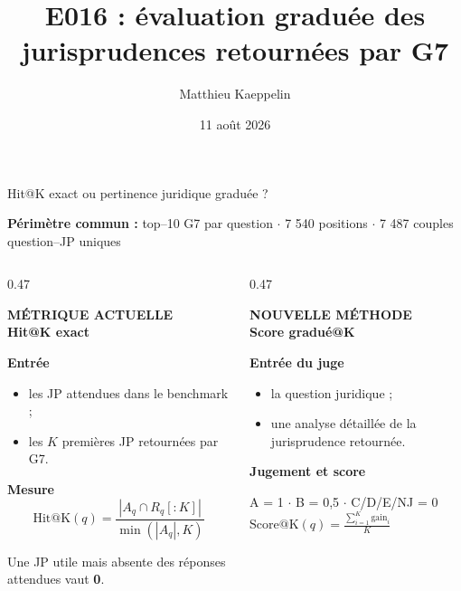 \documentclass[aspectratio=169,10pt]{beamer}
\title[E016 -- JP graduées]{E016 : évaluation graduée des jurisprudences retournées par G7}
\author{Matthieu Kaeppelin}
\institute{Stage FE Recherche}
\date{11 août 2026}
\newcommand{\keybox}[1]{%
  \begin{center}\colorbox{accentsoft}{\parbox{0.92\linewidth}{\centering #1}}\end{center}}
\begin{document}
\begin{frame}[t]{Hit@K exact ou pertinence juridique graduée ?}
  \scriptsize
  \keybox{\small\textbf{Périmètre commun :} top--10 G7 par question $\cdot$ 7 540 positions $\cdot$ 7 487 couples question--JP uniques}

  \vspace{0em}
  \begin{columns}[T,onlytextwidth]
    \begin{column}{0.47\textwidth}
      \begin{center}
        {\color{accent}\textbf{MÉTRIQUE ACTUELLE}}\\[0.05em]
        \large\textbf{Hit@K exact}
      \end{center}

      \vspace{0em}
      \textbf{Entrée}
      \begin{itemize}\setlength{\itemsep}{0.2em}
        \item les JP attendues dans le benchmark ;
        \item les $K$ premières JP retournées par G7.
      \end{itemize}

      \textbf{Mesure}
      \[
        \mathrm{Hit@K}(q)=
        \frac{|A_q\cap R_q[{:}K]|}{\min(|A_q|,K)}
      \]

      \colorbox{yellow!18}{\parbox{0.92\linewidth}{\centering
        Une JP utile mais absente des réponses attendues vaut \textbf{0}.}}
    \end{column}

    \begin{column}{0.47\textwidth}
      \begin{center}
        {\color{ok}\textbf{NOUVELLE MÉTHODE}}\\[0.05em]
        \large\textbf{Score gradué@K}
      \end{center}

      \vspace{0em}
      \textbf{Entrée du juge}
      \begin{itemize}\setlength{\itemsep}{0.2em}
        \item la question juridique ;
        \item une analyse détaillée de la jurisprudence retournée.
      \end{itemize}

      \textbf{Jugement et score}
      \begin{center}
        A = 1 $\cdot$ B = 0,5 $\cdot$ C/D/E/NJ = 0\\[0em]
        $\displaystyle \mathrm{Score@K}(q)=\frac{\sum_{i=1}^{K}\mathrm{gain}_i}{K}$
      \end{center}


\end{column}
\end{columns}
\end{frame}
\end{document}
